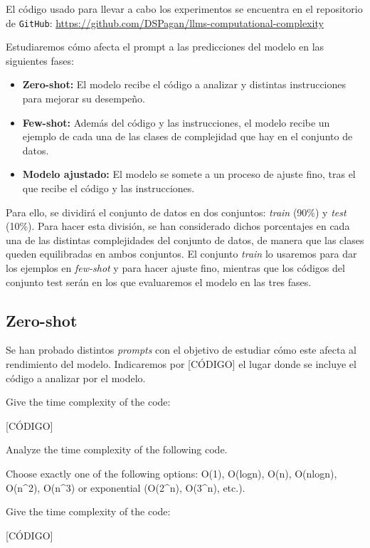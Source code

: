 \documentclass[12pt,twoside]{article}
\begin{document}
El código usado para llevar a cabo los experimentos se encuentra en el repositorio de \texttt{GitHub}: \url{https://github.com/DSPagan/llms-computational-complexity}

Estudiaremos cómo afecta el prompt a las predicciones del modelo en las siguientes fases:

\begin{itemize}
    \item \textbf{Zero-shot:} El modelo recibe el código a analizar y distintas instrucciones para mejorar su desempeño.
    \item \textbf{Few-shot:} Además del código y las instrucciones, el modelo recibe un ejemplo de cada una de las clases de complejidad que hay en el conjunto de datos.
    \item \textbf{Modelo ajustado:} El modelo se somete a un proceso de ajuste fino, tras el que recibe el código y las instrucciones.
\end{itemize}

Para ello, se dividirá el conjunto de datos en dos conjuntos: \textit{train} (90\%) y \textit{test} (10\%). Para hacer esta división, se han considerado dichos porcentajes en cada una de las distintas complejidades del conjunto de datos, de manera que las clases queden equilibradas en ambos conjuntos. El conjunto \textit{train} lo usaremos para dar los ejemplos en \textit{few-shot} y para hacer ajuste fino, mientras que los códigos del conjunto test serán en los que evaluaremos el modelo en las tres fases.

\subsection{Zero-shot}
Se han probado distintos \textit{prompts} con el objetivo de estudiar cómo este afecta al rendimiento del modelo. Indicaremos por [CÓDIGO] el lugar donde se incluye el código a analizar por el modelo.

\begin{tcolorbox}[
  colback=gray!5,
  colframe=black,
  boxrule=0.5pt,
  breakable,
  title=Prompt 1 zero-shot,
]
Give the time complexity of the code:

[CÓDIGO]
\end{tcolorbox}

\begin{tcolorbox}[
  colback=gray!5,
  colframe=black,
  boxrule=0.5pt,
  breakable,
  title=Prompt 2 zero-shot,
]
Analyze the time complexity of the following code.

Choose exactly one of the following options: O(1), O(logn), O(n), O(nlogn), O(n\textasciicircum2), O(n\textasciicircum3) or exponential (O(2\textasciicircum n), O(3\textasciicircum n), etc.).

Give the time complexity of the code:

[CÓDIGO]
\end{tcolorbox}
\end{document}
